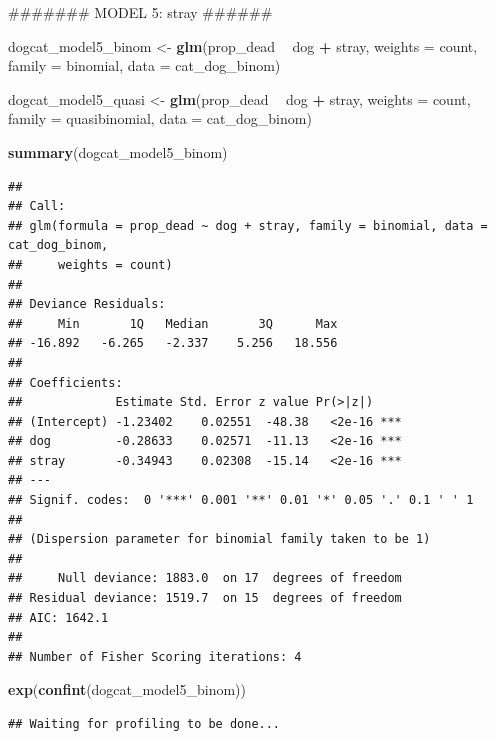 \documentclass[]{article}
\newenvironment{Shaded}{\begin{snugshade}}{\end{snugshade}}
\newcommand{\KeywordTok}[1]{\textcolor[rgb]{0.13,0.29,0.53}{\textbf{#1}}}
\newcommand{\DataTypeTok}[1]{\textcolor[rgb]{0.13,0.29,0.53}{#1}}
\newcommand{\StringTok}[1]{\textcolor[rgb]{0.31,0.60,0.02}{#1}}
\newcommand{\OperatorTok}[1]{\textcolor[rgb]{0.81,0.36,0.00}{\textbf{#1}}}
\newcommand{\NormalTok}[1]{#1}
\begin{document}
\begin{Shaded}
\begin{Highlighting}[]
\NormalTok{####### MODEL 5: stray ######}

\NormalTok{dogcat_model5_binom <-}\StringTok{ }\KeywordTok{glm}\NormalTok{(prop_dead }\OperatorTok{~}\StringTok{ }\NormalTok{dog }\OperatorTok{+}\StringTok{ }\NormalTok{stray, }\DataTypeTok{weights =}\NormalTok{ count, }\DataTypeTok{family =}\NormalTok{ binomial, }\DataTypeTok{data =}\NormalTok{ cat_dog_binom)}

\NormalTok{dogcat_model5_quasi <-}\StringTok{ }\KeywordTok{glm}\NormalTok{(prop_dead }\OperatorTok{~}\StringTok{ }\NormalTok{dog }\OperatorTok{+}\StringTok{ }\NormalTok{stray, }\DataTypeTok{weights =}\NormalTok{ count, }\DataTypeTok{family =}\NormalTok{ quasibinomial, }\DataTypeTok{data =}\NormalTok{ cat_dog_binom)}

\KeywordTok{summary}\NormalTok{(dogcat_model5_binom)}
\end{Highlighting}
\end{Shaded}

\begin{verbatim}
## 
## Call:
## glm(formula = prop_dead ~ dog + stray, family = binomial, data = cat_dog_binom, 
##     weights = count)
## 
## Deviance Residuals: 
##     Min       1Q   Median       3Q      Max  
## -16.892   -6.265   -2.337    5.256   18.556  
## 
## Coefficients:
##             Estimate Std. Error z value Pr(>|z|)    
## (Intercept) -1.23402    0.02551  -48.38   <2e-16 ***
## dog         -0.28633    0.02571  -11.13   <2e-16 ***
## stray       -0.34943    0.02308  -15.14   <2e-16 ***
## ---
## Signif. codes:  0 '***' 0.001 '**' 0.01 '*' 0.05 '.' 0.1 ' ' 1
## 
## (Dispersion parameter for binomial family taken to be 1)
## 
##     Null deviance: 1883.0  on 17  degrees of freedom
## Residual deviance: 1519.7  on 15  degrees of freedom
## AIC: 1642.1
## 
## Number of Fisher Scoring iterations: 4
\end{verbatim}

\begin{Shaded}
\begin{Highlighting}[]
\KeywordTok{exp}\NormalTok{(}\KeywordTok{confint}\NormalTok{(dogcat_model5_binom))}
\end{Highlighting}
\end{Shaded}

\begin{verbatim}
## Waiting for profiling to be done...
\end{verbatim}
\end{document}
